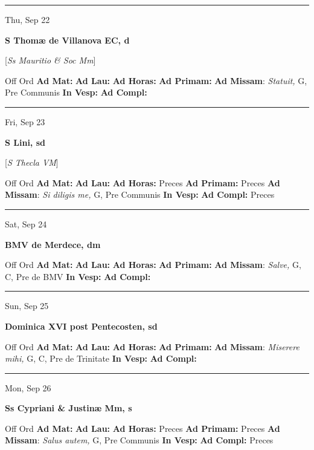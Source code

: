 \documentclass[letterpaper, 10pt]{article}
\begin{document}
\hrule
\begin{center}
Thu, Sep 22
\end{center}\textbf{ \large S Thomæ de Villanova EC, \textnormal{\normalsize d}}

[\textit{Ss Mauritio \& Soc Mm}]
\begin{justify}
Off Ord
\textbf{Ad Mat: }
\textbf{Ad Lau: }
\textbf{Ad Horas: }
\textbf{Ad Primam: }
\textbf{Ad Missam}: \textit{Statuit,} G, Pre Communis
\textbf{In Vesp: }
\textbf{Ad Compl: }\end{justify}



\hrule
\begin{center}
Fri, Sep 23
\end{center}\textbf{ \large S Lini, \textnormal{\normalsize sd}}

[\textit{S Thecla VM}]
\begin{justify}
Off Ord
\textbf{Ad Mat: }
\textbf{Ad Lau: }
\textbf{Ad Horas: }Preces
\textbf{Ad Primam: }Preces
\textbf{Ad Missam}: \textit{Si diligis me,} G, Pre Communis
\textbf{In Vesp: }
\textbf{Ad Compl: }Preces\end{justify}



\hrule
\begin{center}
Sat, Sep 24
\end{center}\textbf{ \large BMV de Merdece, \textnormal{\normalsize dm}}
\begin{justify}
Off Ord
\textbf{Ad Mat: }
\textbf{Ad Lau: }
\textbf{Ad Horas: }
\textbf{Ad Primam: }
\textbf{Ad Missam}: \textit{Salve,} G, C, Pre de BMV
\textbf{In Vesp: }
\textbf{Ad Compl: }\end{justify}



\hrule
\begin{center}
Sun, Sep 25
\end{center}\textbf{ \large Dominica XVI post Pentecosten, \textnormal{\normalsize sd}}
\begin{justify}
Off Ord
\textbf{Ad Mat: }
\textbf{Ad Lau: }
\textbf{Ad Horas: }
\textbf{Ad Primam: }
\textbf{Ad Missam}: \textit{Miserere mihi,} G, C, Pre de Trinitate
\textbf{In Vesp: }
\textbf{Ad Compl: }\end{justify}



\hrule
\begin{center}
Mon, Sep 26
\end{center}\textbf{ \large Ss Cypriani \& Justinæ Mm, \textnormal{\normalsize s}}
\begin{justify}
Off Ord
\textbf{Ad Mat: }
\textbf{Ad Lau: }
\textbf{Ad Horas: }Preces
\textbf{Ad Primam: }Preces
\textbf{Ad Missam}: \textit{Salus autem,} G, Pre Communis
\textbf{In Vesp: }
\textbf{Ad Compl: }Preces\end{justify}
\end{document}
